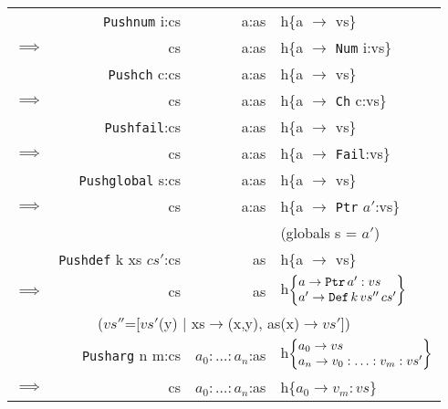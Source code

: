 \documentclass[10pt, a4paper]{article}
\begin{document}
\begin{center}



\begin{tabular}{|rrrl|} 

\hline


& \verb|Pushnum| i:cs & a:as & h\{a $\rightarrow$ vs\} \\ 
$\implies$ & cs & a:as & h\{a $\rightarrow$ \verb|Num| i:vs\} \\ 
\hline

& \verb|Pushch| c:cs & a:as & h\{a $\rightarrow$ vs\} \\ 
$\implies$ & cs & a:as & h\{a $\rightarrow$ \verb|Ch| c:vs\} \\ 
\hline

& \verb|Pushfail|:cs & a:as & h\{a $\rightarrow$ vs\} \\ 
$\implies$ & cs & a:as & h\{a $\rightarrow$ \verb|Fail|:vs\} \\ 
\hline

& \verb|Pushglobal| s:cs & a:as & h\{a $\rightarrow$ vs\} \\ 
$\implies$ & cs & a:as & h\{a $\rightarrow$ \verb|Ptr| $a'$:vs\} \\ 
& & & (globals s = $a'$) \\ 
\hline

& \verb|Pushdef| k xs $cs'$:cs & as & h\{a $\rightarrow$ vs\} \\ 
$\implies$ & cs & as & h$\left\lbrace
                \begin{array}{@{}l@{}}a \rightarrow \verb|Ptr| \, a':vs \\
                              a' \rightarrow \verb|Def| \, k \, vs'' \, cs' \verb||
                \end{array}
              \right\rbrace$ \\
\multicolumn{4}{|c|}{($vs''$=[$vs'$(y) $|$ xs$\rightarrow$(x,y), as(x)$\rightarrow vs'$])} \\
\hline

& \verb|Pusharg| n m:cs & $a_{0}:\ldots:a_{n}$:as &
            h$\left\lbrace
                \begin{array}{@{}l@{}}a_{0} \rightarrow vs \\
                                      a_{n} \rightarrow v_{0}:\ldots:v_{m}:vs'
                \end{array}
              \right\rbrace$ \\
$\implies$ & cs & $a_{0}:\ldots:a_{n}$:as & h\{$a_{0} \rightarrow v_{m}:vs$\} \\
\hline


\end{tabular}
\end{center}
\end{document}
